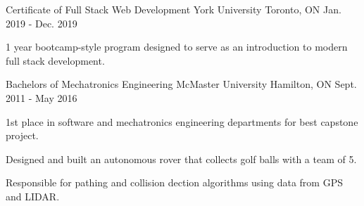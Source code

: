 

\begin{cventries}

  \cventry
    {Certificate of Full Stack Web Development} %
    {York University} %
    {Toronto, ON} %
    {Jan. 2019 - Dec. 2019} %
    {
      \begin{cvitems} %
        \item {1 year bootcamp-style program designed to serve as an introduction to modern full stack development.}
      \end{cvitems}
    }

  \cventry
    {Bachelors of Mechatronics Engineering} %
    {McMaster University} %
    {Hamilton, ON} %
    {Sept. 2011 - May 2016} %
    {
      \begin{cvitems} %
        \item {1st place in software and mechatronics engineering departments for best capstone project.}
        \item {Designed and built an autonomous rover that collects golf balls with a team of 5.}
        \item {Responsible for pathing and collision dection algorithms using data from GPS and LIDAR.}
      \end{cvitems}
    }

\end{cventries}
